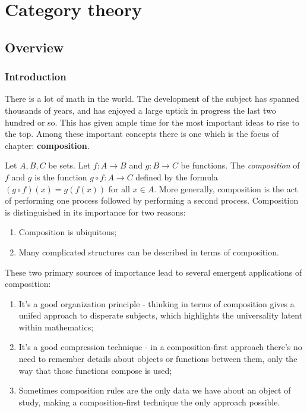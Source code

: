 \section{Category theory}
\label{Category theory}

\subsection{Overview}

\subsubsection{Introduction}

There is a lot of math in the world. The development of the subject has spanned thousands of years, and has enjoyed a large uptick in progress the last two hundred or so. This has given ample time for the most important ideas to rise to the top. Among these important concepts there is one which is the focus of chapter: \textbf{composition}.

Let $A,B,C$ be sets. Let $f:A\to B$ and $g:B\to C$ be functions. The {\em composition} of $f$ and $g$ is the function $g\circ f: A\to C$ defined by the formula $(g\circ f)(x)=g(f(x))$ for all $x\in A$. More generally, composition is the act of performing one process followed by performing a second process. Composition is distinguished in its importance for two reasons:

\begin{enumerate}
\item Composition is ubiquitous;
\item Many complicated structures can be described in terms of composition.
\end{enumerate}

These two primary sources of importance lead to several emergent applications of composition:

\begin{enumerate}
\item It's a good organization principle - thinking in terms of composition gives a unifed approach to disperate subjects, which highlights the universality latent within mathematics;
\item It's a good compression technique - in a composition-first approach there's no need to remember details about objects or functions between them, only the way that those functions compose is used;
\item Sometimes composition rules are the only data we have about an object of study, making a composition-first technique the only approach possible.
\end{enumerate}

